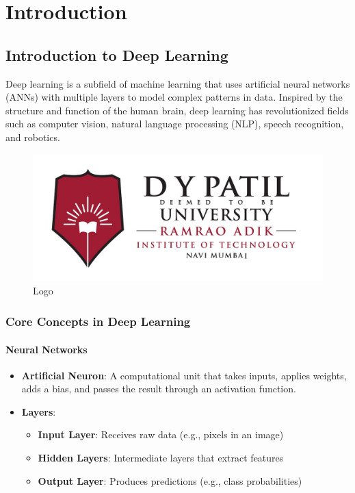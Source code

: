 \renewcommand{\baselinestretch}{1.5}\normalsize

\chapter{Introduction}


	
\label{Chapter Introduction}

\section{Introduction to Deep Learning}
 \cite{goodfellow2014generative} \cite{lecun2015deep}
Deep learning is a subfield of machine learning that uses artificial neural networks (ANNs) with multiple layers to model complex patterns in data. Inspired by the structure and function of the human brain, deep learning has revolutionized fields such as computer vision, natural language processing (NLP), speech recognition, and robotics.

\begin{figure}[h!]
	\centering
	\includegraphics[width=0.35\linewidth]{./graphics/raitlogo.jpeg} %
	\hspace{2cm}
	\caption  {Logo}
	
\end{figure}

\subsection{Core Concepts in Deep Learning}
\subsubsection{Neural Networks}
\begin{itemize}
	\item \textbf{Artificial Neuron}: A computational unit that takes inputs, applies weights, adds a bias, and passes the result through an activation function.
	\item \textbf{Layers}:
	\begin{itemize}
		\item \textbf{Input Layer}: Receives raw data (e.g., pixels in an image)
		\item \textbf{Hidden Layers}: Intermediate layers that extract features
		\item \textbf{Output Layer}: Produces predictions (e.g., class probabilities)
	\end{itemize}
\end{itemize}

